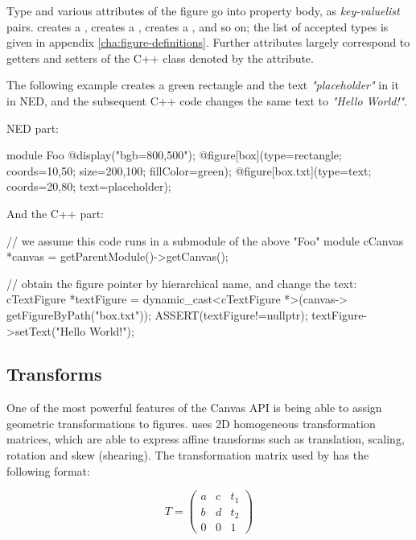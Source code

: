 Type and various attributes of the figure go into property body, as
\textit{key-valuelist} pairs.  creates a
,  creates a
,  creates a ,
and so on; the list of accepted types is given in appendix
\ref{cha:figure-definitions}. Further attributes largely correspond to
getters and setters of the C++ class denoted by the  attribute.

The following example creates a green rectangle and the text
\textit{"placeholder"} in it in NED, and the subsequent C++ code changes
the same text to \textit{"Hello World!"}.

NED part:

\begin{ned}
module Foo
{
    @display("bgb=800,500");
    @figure[box](type=rectangle; coords=10,50; size=200,100; fillColor=green);
    @figure[box.txt](type=text; coords=20,80; text=placeholder);
}
\end{ned}

And the C++ part:

\begin{cpp}
// we assume this code runs in a submodule of the above "Foo" module
cCanvas *canvas = getParentModule()->getCanvas();

// obtain the figure pointer by hierarchical name, and change the text:
cTextFigure *textFigure = dynamic_cast<cTextFigure *>(canvas->
                                          getFigureByPath("box.txt"));
ASSERT(textFigure!=nullptr);
textFigure->setText("Hello World!");
\end{cpp}




\subsection{Transforms}

One of the most powerful features of the Canvas API is being able to assign
geometric transformations to figures. {\opp} uses 2D homogeneous
transformation matrices, which are able to express affine transforms such
as translation, scaling, rotation and skew (shearing). The
transformation matrix used by {\opp} has the following format:

\[ T = \left( \begin{array}{ccc}
a & c & t_1 \\
b & d & t_2 \\
0 & 0 & 1 \end{array} \right)\]

